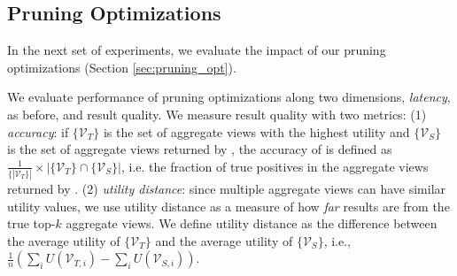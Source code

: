 
\subsection{Pruning Optimizations}
\label{sec:custom_execution_engine_expts}
In the next set of experiments, we evaluate 
the impact of our pruning optimizations (Section \ref{sec:pruning_opt}).

We evaluate performance of pruning optimizations along two dimensions, {\em latency}, as before, and
result quality.
We measure result quality with two metrics: 
(1) {\em accuracy}: if $\{\mathcal{V}_T\}$
is the set of aggregate views with the highest utility and $\{\mathcal{V}_S\}$ is the set of 
aggregate views returned by
\SeeDB, the accuracy of \SeeDB is defined as $\frac{1}{\{|\mathcal{V}_T\}|} \times 
|\{\mathcal{V}_T\} \cap \{\mathcal{V}_S\}|$, i.e. the
fraction of true positives in the aggregate views returned by \SeeDB. 
(2) {\em utility distance}: since multiple
aggregate views can have similar utility values, we use utility distance as a measure of how {\it far} \SeeDB 
results are from the true top-$k$ aggregate views. 
We define utility distance as the difference between the average utility of $\{\mathcal{V}_T\}$ 
and the average utility of $\{\mathcal{V}_S\}$, i.e., $\frac{1}{n}(\sum_{i}U(\mathcal{V}_{T,i}) - 
\sum_{i}U(\mathcal{V}_{S,i}))$.


